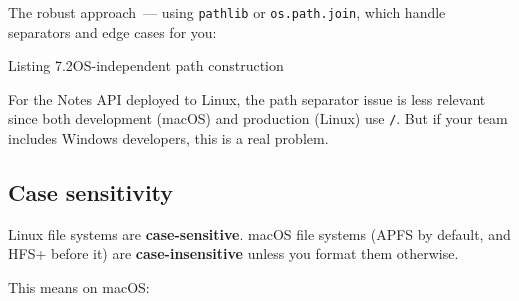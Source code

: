 \noindent{}The robust approach~--- using \texttt{pathlib} or \texttt{os.path.join}, which handle separators and edge cases for you:

\begin{codeboxcap}[short]{\textcolor{accent}{Listing 7.2}\enspace OS-independent path construction}

\begin{Shaded}
\begin{Highlighting}[]

\OperatorTok{=}\NormalTok{) }\OperatorTok{/} 

\OperatorTok{=}\NormalTok{, }\NormalTok{)}
\end{Highlighting}
\end{Shaded}

\end{codeboxcap}

\noindent{}For the Notes API deployed to Linux, the path separator issue is less relevant since both development (macOS) and production (Linux) use \texttt{/}. But if your team includes Windows developers, this is a real problem.

\subsection*{Case sensitivity}\label{07-environment-drift:case-sensitivity}

Linux file systems are \textbf{case-sensitive}. macOS file systems (APFS by default, and HFS+ before it) are \textbf{case-insensitive} unless you format them otherwise.

This means on macOS:

\begin{codebox}[short]

\begin{Shaded}
\begin{Highlighting}[]
\NormalTok{(}\NormalTok{)  }
\NormalTok{(}\NormalTok{)  }
\end{Highlighting}
\end{Shaded}

\end{codebox}


